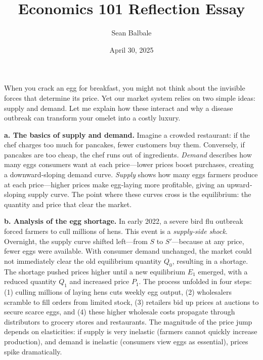 \documentclass[12pt]{article}
\begin{document}
\makeatletter
\def\@maketitle{%
  \begin{center}%
  \let \footnote \thanks
    {\LARGE \@title \par}%
    {\large
      \@author \quad \@date}%
    \vskip 1em%
  \end{center}%
  \par
  }
\makeatother

\begin{doublespace}

    \title{Economics 101 Reflection Essay}
    \author{Sean Balbale}
    \date{April 30, 2025}
    


\maketitle




When you crack an egg for breakfast, you might not think about the invisible forces that determine its price. Yet our market system relies on two simple ideas: supply and demand. Let me explain how these interact and why a disease outbreak can transform your omelet into a costly luxury.

\textbf{a. The basics of supply and demand.} Imagine a crowded restaurant: if the chef charges too much for pancakes, fewer customers buy them. Conversely, if pancakes are too cheap, the chef runs out of ingredients. \emph{Demand} describes how many eggs consumers want at each price—lower prices boost purchases, creating a downward‐sloping demand curve. \emph{Supply} shows how many eggs farmers produce at each price—higher prices make egg‐laying more profitable, giving an upward‐sloping supply curve. The point where these curves cross is the equilibrium: the quantity and price that clear the market.

\textbf{b. Analysis of the egg shortage.} In early 2022, a severe bird flu outbreak forced farmers to cull millions of hens. This event is a \emph{supply‐side shock}. Overnight, the supply curve shifted left—from $S$ to $S'$—because at any price, fewer eggs were available. With consumer demand unchanged, the market could not immediately clear the old equilibrium quantity $Q_0$, resulting in a shortage. The shortage pushed prices higher until a new equilibrium $E_1$ emerged, with a reduced quantity $Q_1$ and increased price $P_1$.  
The process unfolded in four steps: (1) culling millions of laying hens cuts weekly egg output, (2) wholesalers scramble to fill orders from limited stock, (3) retailers bid up prices at auctions to secure scarce eggs, and (4) these higher wholesale costs propagate through distributors to grocery stores and restaurants. The magnitude of the price jump depends on elasticities: if supply is very inelastic (farmers cannot quickly increase production), and demand is inelastic (consumers view eggs as essential), prices spike dramatically.


\end{doublespace}
\end{document}
